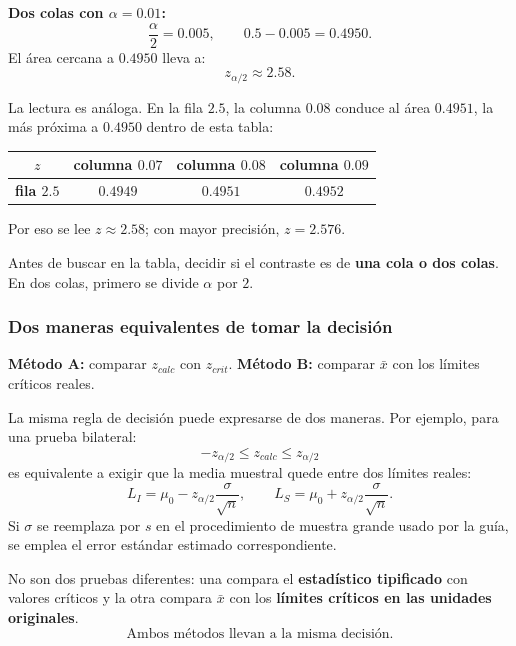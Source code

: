 \documentclass[11pt,a4paper]{article}
\begin{document}
\textbf{Dos colas con $\alpha=0.01$:}
\[
\frac{\alpha}{2}=0.005,
\qquad
0.5-0.005=0.4950.
\]
El área cercana a $0.4950$ lleva a:
\[
z_{\alpha/2}\approx2.58.
\]

La lectura es análoga. En la fila $2.5$, la columna $0.08$ conduce al área $0.4951$, la más próxima a $0.4950$ dentro de esta tabla:
\begin{center}
\small
\renewcommand{\arraystretch}{1.2}
\begin{tabular}{c|ccc}
\toprule
$z$ & columna $0.07$ & \cellcolor{rejectred!22}\bfseries columna $0.08$ & columna $0.09$\\
\midrule
\cellcolor{rejectred!22}\bfseries fila $2.5$ & $0.4949$ &
\cellcolor{rejectred!38}\bfseries $0.4951$ & $0.4952$\\
\bottomrule
\end{tabular}
\end{center}
Por eso se lee $z\approx2.58$; con mayor precisión, $z=2.576$.

\begin{regla}
Antes de buscar en la tabla, decidir si el contraste es de \textbf{una cola o dos colas}. En dos colas, primero se divide $\alpha$ por $2$.
\end{regla}

\subsubsection{Dos maneras equivalentes de tomar la decisión}

\textbf{Método A:} comparar $z_{calc}$ con $z_{crit}$.\qquad
\textbf{Método B:} comparar $\bar{x}$ con los límites críticos reales.

La misma regla de decisión puede expresarse de dos maneras. Por ejemplo, para una prueba bilateral:
\[
-z_{\alpha/2}\le z_{calc}\le z_{\alpha/2}
\]
es equivalente a exigir que la media muestral quede entre dos límites reales:
\[
L_I=\mu_0-z_{\alpha/2}\frac{\sigma}{\sqrt n},
\qquad
L_S=\mu_0+z_{\alpha/2}\frac{\sigma}{\sqrt n}.
\]
Si $\sigma$ se reemplaza por $s$ en el procedimiento de muestra grande usado por la guía, se emplea el error estándar estimado correspondiente.

\begin{ideaclave}
No son dos pruebas diferentes: una compara el \textbf{estadístico tipificado} con valores críticos y la otra compara $\bar{x}$ con los \textbf{límites críticos en las unidades originales}.
\[
\boxed{\text{Ambos métodos llevan a la misma decisión}.}
\]
\end{ideaclave}
\end{document}

